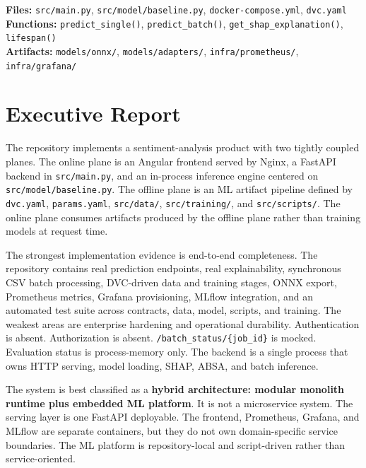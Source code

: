 \begin{EvidenceBox}
\textbf{Files:} \texttt{src/main.py}, \texttt{src/model/baseline.py}, \texttt{docker-compose.yml}, \texttt{dvc.yaml}\\
\textbf{Functions:} \texttt{predict\_single()}, \texttt{predict\_batch()}, \texttt{get\_shap\_explanation()}, \texttt{lifespan()}\\
\textbf{Artifacts:} \texttt{models/onnx/}, \texttt{models/adapters/}, \texttt{infra/prometheus/}, \texttt{infra/grafana/}
\end{EvidenceBox}

\section*{Executive Report}
The repository implements a sentiment-analysis product with two tightly coupled planes. The online plane is an Angular frontend served by Nginx, a FastAPI backend in \texttt{src/main.py}, and an in-process inference engine centered on \texttt{src/model/baseline.py}. The offline plane is an ML artifact pipeline defined by \texttt{dvc.yaml}, \texttt{params.yaml}, \texttt{src/data/}, \texttt{src/training/}, and \texttt{src/scripts/}. The online plane consumes artifacts produced by the offline plane rather than training models at request time.

The strongest implementation evidence is end-to-end completeness. The repository contains real prediction endpoints, real explainability, synchronous CSV batch processing, DVC-driven data and training stages, ONNX export, Prometheus metrics, Grafana provisioning, MLflow integration, and an automated test suite across contracts, data, model, scripts, and training. The weakest areas are enterprise hardening and operational durability. Authentication is absent. Authorization is absent. \texttt{/batch\_status/\{job\_id\}} is mocked. Evaluation status is process-memory only. The backend is a single process that owns HTTP serving, model loading, SHAP, ABSA, and batch inference.

The system is best classified as a \textbf{hybrid architecture: modular monolith runtime plus embedded ML platform}. It is not a microservice system. The serving layer is one FastAPI deployable. The frontend, Prometheus, Grafana, and MLflow are separate containers, but they do not own domain-specific service boundaries. The ML platform is repository-local and script-driven rather than service-oriented.

